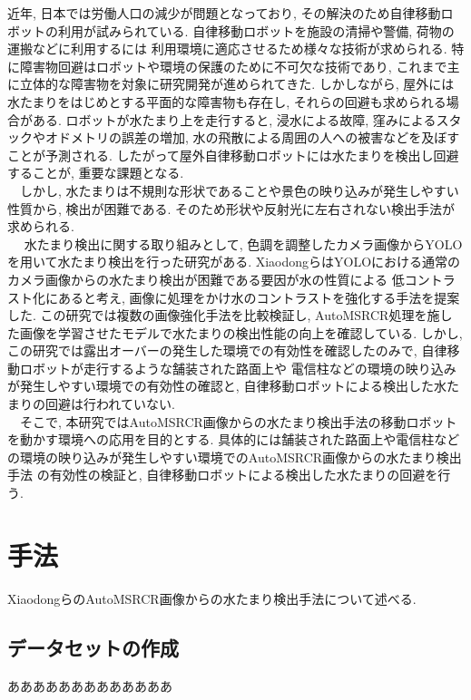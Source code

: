 \documentclass[10pt]{jarticle}
\begin{document}
    近年, 日本では労働人口の減少が問題となっており, 
    その解決のため自律移動ロボットの利用が試みられている. 
    自律移動ロボットを施設の清掃や警備, 荷物の運搬などに利用するには
    利用環境に適応させるため様々な技術が求められる. 
    特に障害物回避はロボットや環境の保護のために不可欠な技術であり, 
    これまで主に立体的な障害物を対象に研究開発が進められてきた. 
    しかしながら, 屋外には水たまりをはじめとする平面的な障害物も存在し, 
    それらの回避も求められる場合がある. ロボットが水たまり上を走行すると, 
    浸水による故障, 窪みによるスタックやオドメトリの誤差の増加, 
    水の飛散による周囲の人への被害などを及ぼすことが予測される. 
    したがって屋外自律移動ロボットには水たまりを検出し回避することが, 
    重要な課題となる.\\ 
    　しかし, 水たまりは不規則な形状であることや景色の映り込みが発生しやすい性質から, 
    検出が困難である. そのため形状や反射光に左右されない検出手法が求められる.\\
    　 水たまり検出に関する取り組みとして, 
    色調を調整したカメラ画像からYOLOを用いて水たまり検出を行った研究がある. 
    Xiaodongら\cite{工大2005}はYOLOにおける通常のカメラ画像からの水たまり検出が困難である要因が水の性質による
    低コントラスト化にあると考え, 画像に処理をかけ水のコントラストを強化する手法を提案した. 
    この研究では複数の画像強化手法を比較検証し, 
    AutoMSRCR処理を施した画像を学習させたモデルで水たまりの検出性能の向上を確認している. 
    しかし, この研究では露出オーバーの発生した環境での有効性を確認したのみで, 
    自律移動ロボットが走行するような舗装された路面上や
    電信柱などの環境の映り込みが発生しやすい環境での有効性の確認と, 
    自律移動ロボットによる検出した水たまりの回避は行われていない. \\
    　そこで, 本研究ではAutoMSRCR画像からの水たまり検出手法の移動ロボットを動かす環境への応用を目的とする. 
    具体的には舗装された路面上や電信柱などの環境の映り込みが発生しやすい環境でのAutoMSRCR画像からの水たまり検出手法
    の有効性の検証と, 自律移動ロボットによる検出した水たまりの回避を行う.


    \section{手法}%
        XiaodongらのAutoMSRCR画像からの水たまり検出手法について述べる. 
    \subsection{データセットの作成}
    あああああああああああああ
\end{document}
